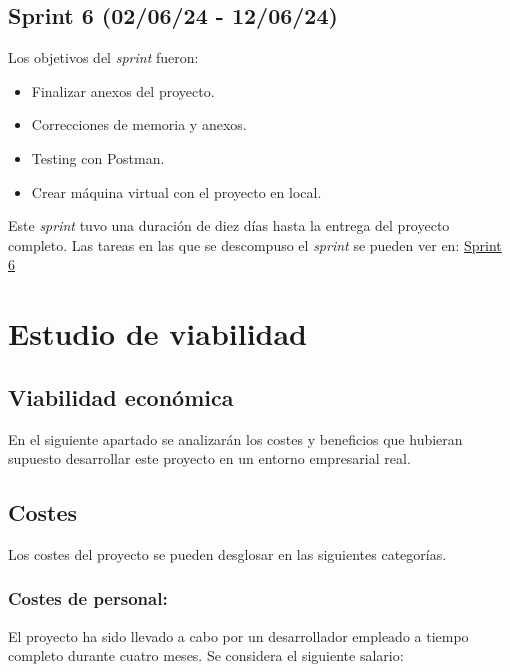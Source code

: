 \subsection{\textbf{Sprint 6 (02/06/24 - 12/06/24)}}
Los objetivos del \textit{sprint} fueron:
\begin{itemize}
    \item Finalizar anexos del proyecto.
    \item Correcciones de memoria y anexos.
    \item Testing con Postman.
    \item Crear máquina virtual con el proyecto en local.
\end{itemize}
Este \textit{sprint} tuvo una duración de diez días hasta la entrega del proyecto completo.
Las tareas en las que se descompuso el \textit{sprint} se pueden ver en:
\href{https://github.com/MiguelExtremo/TFG/milestone/6}{Sprint 6}

\section{Estudio de viabilidad}
\subsection{Viabilidad económica}
En el siguiente apartado se analizarán los costes y beneficios que hubieran supuesto desarrollar este proyecto en un entorno empresarial real. \\
\subsection{Costes}
Los costes del proyecto se pueden desglosar en las siguientes categorías.
\subsubsection{Costes de personal:}
El proyecto ha sido llevado a cabo por un desarrollador empleado a tiempo completo durante cuatro meses. Se considera el siguiente salario: \\


